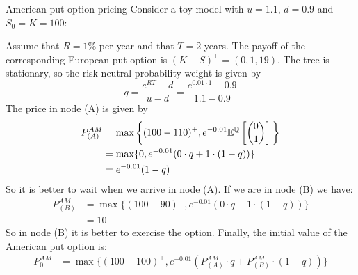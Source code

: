 \begin{example}{American put option pricing}{}{}
    Consider a toy model with $u=1.1$, $d=0.9$ and $S_0=K=100$:
    \begin{center}
    \end{center}
    Assume that $R=1\%$ per year and that $T=2$ years. The payoff of the corresponding European put option is $(K-S)^+=(0,1,19)$. The tree is stationary, so the risk neutral probability weight is given by
    \begin{equation*}
        q = \dfrac{e^{RT}-d}{u-d} = \dfrac{e^{0.01\cdot1}-0.9}{1.1-0.9}
    \end{equation*}
    The price in node (A) is given by
    \begin{align*}
        P^{AM}_{(A)} &= \max\bigg\{(100-110)^+,e^{-0.01}\mathbb{E}^{\mathbb{Q}}\left[\binom{0}{1}\right] \bigg\} \\
        &= \max\{0,e^{-0.01}(0\cdot q +1\cdot(1-q))\} \\
        &= e^{-0.01}(1-q)
    \end{align*}
    So it is better to wait when we arrive in node (A). If we are in node (B) we have:
    \begin{align*}
        P^{AM}_{(B)} &= \max\{(100-90)^+, e^{-0.01}(0\cdot q +1\cdot(1-q))\} \\ 
        &= 10
    \end{align*}
    So in node (B) it is better to exercise the option. Finally, the initial value of the American put option is:
    \begin{align*}
        P^{AM}_{0} &= \max\{(100-100)^+, e^{-0.01}(P^{AM}_{(A)}\cdot q +P^{AM}_{(B)}\cdot(1-q))\} \\ 

\end{align*}
\end{example}
